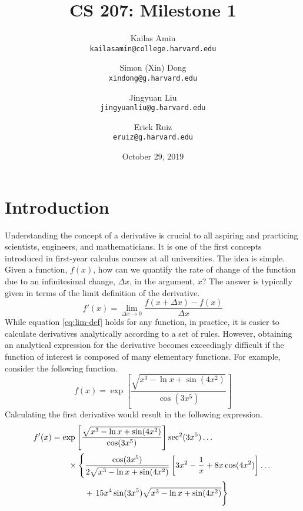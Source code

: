 
\usepackage{minted}

    \title{CS 207: Milestone 1}
    \author{
        Kailas Amin\\ \texttt{kailasamin@college.harvard.edu}
        \and Simon (Xin) Dong\\ \texttt{xindong@g.harvard.edu}
        \and Jingyuan Liu\\ \texttt{jingyuanliu@g.harvard.edu}
        \and Erick Ruiz\\ \texttt{eruiz@g.harvard.edu}
        }
    \date{October 29, 2019}
    \maketitle
    
    \section*{Introduction}
    Understanding the concept of a derivative is crucial to all aspiring and 
    practicing scientists, engineers, and mathematicians. It is one of the first
    concepts introduced in first-year calculus courses at all universities. The 
    idea is simple. Given a function, $f(x)$, how can we quantify the rate of 
    change of the function due to an infinitesimal change, $\Delta x$, in the 
    argument, $x$? The answer is typically given in terms of the limit 
    definition of the derivative.
    \begin{equation}
        f'(x) = \lim_{\Delta x\rightarrow 0} \frac{f(x+\Delta x)-f(x)}{\Delta x}
        \label{eq:lim-def}
    \end{equation}
    While equation \eqref{eq:lim-def} holds for any function, in practice, it is
    easier to calculate derivatives analytically according to a set of rules. 
    However, obtaining an analytical expression for the derivative becomes 
    exceedingly difficult if the function of interest is composed of many 
    elementary functions. For example, consider the following function.
    \begin{equation}
        f(x) = \exp\left[\frac{\sqrt{x^3 - \ln x + \sin(4x^2)}}{\cos(3x^5)}\right]
        \label{eq:ugly-eq}
    \end{equation}
    Calculating the first derivative would result in the following expression.
    \begin{align}
        f'(x) &= \exp\left[\frac{\sqrt{x^3 - \ln x + \sin(4x^2)}}{\cos(3x^5)}\right]
        \sec^2(3x^5)\dots\nonumber\\
        &\qquad\times\left\{
        \frac{\cos(3x^5)}{2\sqrt{x^3 - \ln x + \sin(4x^2)}}
        \left[3x^2-\frac{1}{x}+8x\cos(4x^2)\right]\dots\right.\nonumber\\
        &\qquad\qquad+
        \left.\vphantom{\frac{\cos(3x^5)}{2\sqrt{x^3 - \ln x + \sin(4x^2)}}}
        15x^4\sin(3x^5)\sqrt{x^3 - \ln x + \sin(4x^2)}
        \right\}
    \end{align}
